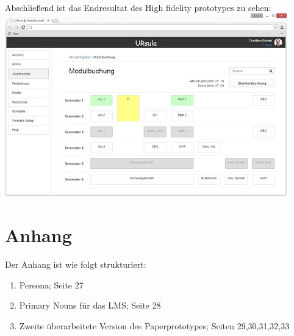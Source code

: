 \documentclass{article}
\begin{document}
\\
Abschließend ist das Endresultat des High fidelity prototypes zu sehen:
\\
\includegraphics{img/prototype}\\
\newpage

\section{Anhang}

Der Anhang ist wie folgt strukturiert:
\begin{enumerate}
\item Persona; Seite 27
\item Primary Nouns für das LMS; Seite 28
\item Zweite überarbeitete Version des Paperprototypes; Seiten 29,30,31,32,33
\end{enumerate}

 


\end{document}
